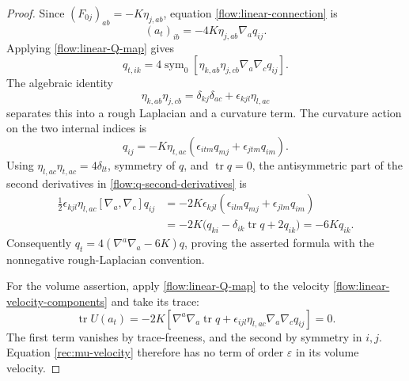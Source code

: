 \documentclass[11pt]{article}
\numberwithin{equation}{section}
\theoremstyle{definition}
\theoremstyle{remark}
\begin{document}
\begin{proof}
Since $(F_{0j})_{ab}=-K\eta_{j,ab}$, equation
\eqref{flow:linear-connection} is
\begin{equation}
 (a_t)_{ib}=-4K\eta_{j,ab}\nabla_aq_{ij}.
 \label{flow:linear-velocity-components}
\end{equation}
Applying \eqref{flow:linear-Q-map} gives
\begin{equation}
 q_{t,ik}=4\operatorname{sym}_0
  \left[\eta_{k,ab}\eta_{j,cb}\nabla_a\nabla_cq_{ij}\right].
 \label{flow:q-second-derivatives}
\end{equation}
The algebraic identity
\begin{equation}
 \eta_{k,ab}\eta_{j,cb}
   =\delta_{kj}\delta_{ac}+\epsilon_{kjl}\eta_{l,ac}
 \label{flow:eta-product}
\end{equation}
separates this into a rough Laplacian and a curvature term.
The curvature action on the two internal indices is
\begin{equation}
 [\nabla_a,\nabla_c]q_{ij}
   =-K\eta_{t,ac}
      (\epsilon_{itm}q_{mj}+\epsilon_{jtm}q_{im}).
 \label{flow:q-curvature-action}
\end{equation}
Using $\eta_{l,ac}\eta_{t,ac}=4\delta_{lt}$, symmetry of $q$, and
$\operatorname{tr}q=0$, the antisymmetric part of the second derivatives
in \eqref{flow:q-second-derivatives} is
\begin{align}
 \frac12\epsilon_{kjl}\eta_{l,ac}
       [\nabla_a,\nabla_c]q_{ij}
 &=-2K\epsilon_{kjl}
       (\epsilon_{ilm}q_{mj}+\epsilon_{jlm}q_{im})\nonumber\\
 &=-2K\bigl(q_{ki}-\delta_{ik}\operatorname{tr}q+2q_{ik}\bigr)
   =-6Kq_{ik}.
 \label{flow:q-curvature-contraction}
\end{align}
Consequently $q_t=4(\nabla^a\nabla_a-6K)q$, proving the asserted
formula with the nonnegative rough-Laplacian convention.

For the volume assertion, apply \eqref{flow:linear-Q-map} to the
velocity \eqref{flow:linear-velocity-components} and take its trace:
\begin{equation}
 \operatorname{tr}U(a_t)
 =-2K\left[
     \nabla^a\nabla_a\operatorname{tr}q
     +\epsilon_{ijl}\eta_{l,ac}\nabla_a\nabla_cq_{ij}\right]=0.
\end{equation}
The first term vanishes by trace-freeness, and the second by symmetry
in $i,j$.  Equation \eqref{rec:mu-velocity} therefore has no term of
order $\varepsilon$ in its volume velocity.
\end{proof}
\end{document}
